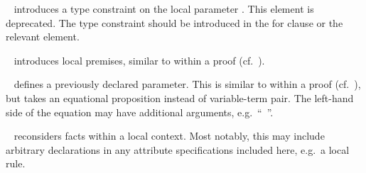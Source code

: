 \begin{isabellebody}
\begin{isamarkuptext}
\begin{description}
\begin{description}
  \item \hyperlink{element.constrains}{\mbox{}}~ introduces a type
  constraint  on the local parameter .  This
  element is deprecated.  The type constraint should be introduced in
  the for clause or the relevant \hyperlink{element.fixes}{\mbox{}} element.

  \item \hyperlink{element.assumes}{\mbox{}}~
  introduces local premises, similar to \hyperlink{command.assume}{\mbox{}} within a
  proof (cf.\ ).

  \item \hyperlink{element.defines}{\mbox{}}~ defines a previously
  declared parameter.  This is similar to \hyperlink{command.def}{\mbox{}} within a
  proof (cf.\ ), but \hyperlink{element.defines}{\mbox{}}
  takes an equational proposition instead of variable-term pair.  The
  left-hand side of the equation may have additional arguments, e.g.\
  ``\hyperlink{element.defines}{\mbox{}}~''.

  \item \hyperlink{element.notes}{\mbox{}}~
  reconsiders facts within a local context.  Most notably, this may
  include arbitrary declarations in any attribute specifications
  included here, e.g.\ a local \hyperlink{attribute.simp}{\mbox{}} rule.


\end{description}
\end{description}
\end{isamarkuptext}
\end{isabellebody}
